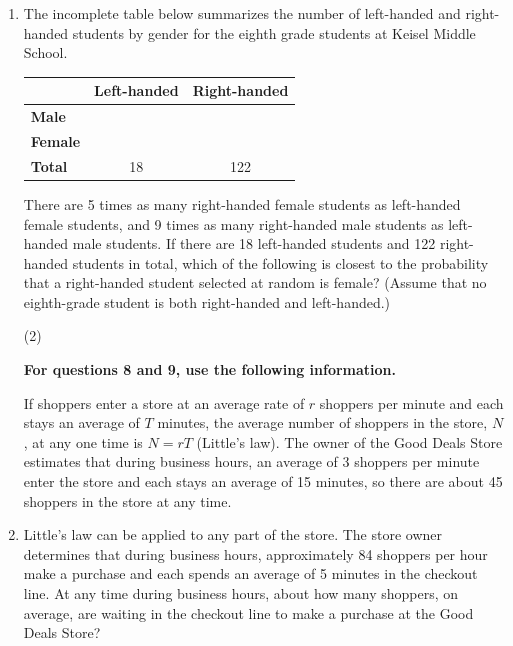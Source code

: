 \begin{enumerate}[leftmargin=*, label=\textbf{\arabic*.}, resume]

  \item The incomplete table below summarizes the number of left-handed and right-handed students by gender for the eighth grade students at Keisel Middle School.
  \begin{center}
  \begin{tabular}{|l|c|c|}
    \hline
    & \textbf{Left-handed} & \textbf{Right-handed} \\ \hline
    \textbf{Male}   & \hspace{1.2cm} & \hspace{1.2cm} \\ \hline
    \textbf{Female} & \hspace{1.2cm} & \hspace{1.2cm} \\ \hline
    \textbf{Total} & 18 & 122 \\ \hline
  \end{tabular}
  \end{center} There are 5 times as many right-handed female students as left-handed female students, and 9 times as many right-handed male students as left-handed male students. If there are 18 left-handed students and 122 right-handed students in total, which of the following is closest to the probability that a right-handed student selected at random is female? (Assume that no eighth-grade student is both right-handed and left-handed.)

  \begin{tasks}(2)
  \end{tasks}
  \vspace{4cm}


  \newpage

  \textbf{For questions 8 and 9, use the following information.} 
  
  If shoppers enter a store at an average rate of $r$ shoppers per minute and each stays an average of $T$ minutes, the average number of shoppers in the store, $N$, at any one time is $N = rT$ (Little's law). The owner of the Good Deals Store estimates that during business hours, an average of 3 shoppers per minute enter the store and each stays an average of 15 minutes, so there are about 45 shoppers in the store at any time.

  \item Little's law can be applied to any part of the store. The store owner determines that during business hours, approximately 84 shoppers per hour make a purchase and each spends an average of 5 minutes in the checkout line. At any time during business hours, about how many shoppers, on average, are waiting in the checkout line to make a purchase at the Good Deals Store?
  \vspace{4cm}


\end{enumerate}
